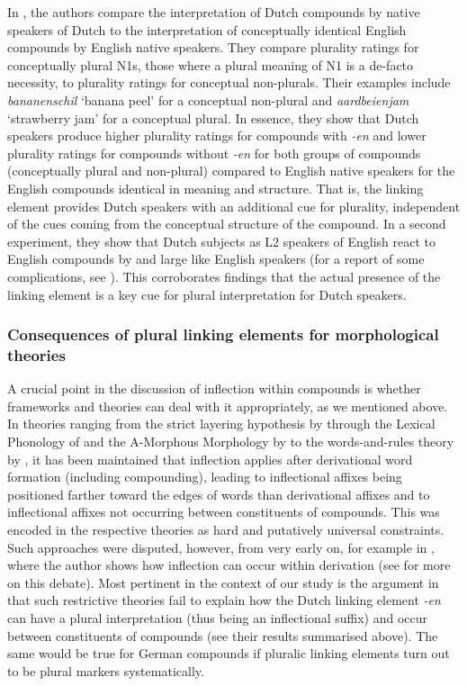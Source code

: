 In \citet{BangaEa2013b}, the authors compare the interpretation of Dutch compounds by native speakers of Dutch to the interpretation of conceptually identical English compounds by English native speakers.
They compare plurality ratings for conceptually plural N1s, \ie those where a plural meaning of N1 is a de-facto necessity, to plurality ratings for conceptual non-plurals.
Their examples include \textit{bananenschil} `banana peel' for a conceptual non-plural and \textit{aardbeienjam} `strawberry jam' for a conceptual plural.
In essence, they show that Dutch speakers produce higher plurality ratings for compounds with \textit{-en} and lower plurality ratings for compounds without \textit{-en} for both groups of compounds (conceptually plural and non-plural) compared to English native speakers for the English compounds identical in meaning and structure.
That is, the linking element provides Dutch speakers with an additional cue for plurality, independent of the cues coming from the conceptual structure of the compound.
In a second experiment, they show that Dutch subjects as L2 speakers of English react to English compounds by and large like English speakers (for a report of some complications, see \citealt[211]{BangaEa2013b}).
This corroborates findings that the actual presence of the linking element is a key cue for plural interpretation for Dutch speakers.


\subsubsection{Consequences of plural linking elements for morphological theories}
\label{sec:consequencesofplurallinkagesformorphologicaltheories}

A crucial point in the discussion of inflection within compounds is whether frameworks and theories can deal with it appropriately, as we mentioned above.
In theories ranging from the strict layering hypothesis by \citet{Siegel1979} through the Lexical Phonology of \citet{Mohanan1986} and the A-Morphous Morphology by \citet{Anderson1992} to the words-and-rules theory by \citet{Pinker1999}, it has been maintained that inflection applies after derivational word formation (including compounding), leading to inflectional affixes being positioned farther toward the edges of words than derivational affixes and to inflectional affixes not occurring between constituents of compounds.
This was encoded in the respective theories as hard and putatively universal constraints.
Such approaches were disputed, however, from very early on, for example in \citet{Bochner1984}, where the author shows how inflection can occur within derivation (see \citealt[2--3]{KirchnerNicoladis2009} for more on this debate).
Most pertinent in the context of our study is the argument in \citet[47--48]{BangaEa2013a} that such restrictive theories fail to explain how the Dutch linking element \textit{-en} can have a plural interpretation (thus being an inflectional suffix) and occur between constituents of compounds (see their results summarised above).
The same would be true for German compounds if pluralic linking elements turn out to be plural markers systematically.

